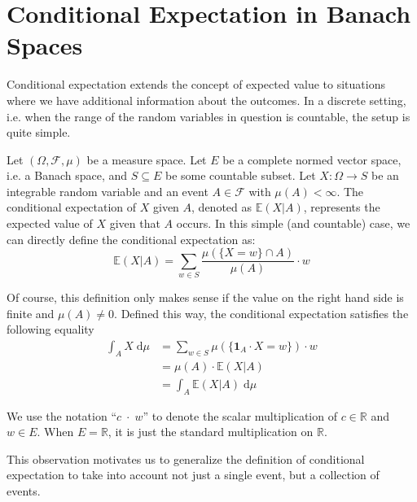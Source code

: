 ﻿%

\chapter{Conditional Expectation in Banach Spaces}\label{chapter:conditional_expectation}

Conditional expectation extends the concept of expected value to situations where we have additional information about the outcomes. In a discrete setting, i.e. when the range of the random variables in question is countable, the setup is quite simple. 
\begin{example}
\par Let $(\Omega, \mathcal{F}, \mu)$ be a measure space. Let $E$ be a complete normed vector space, i.e. a Banach space, and $S \subseteq E$ be some countable subset. Let $X : \Omega \rightarrow S$ be an integrable random variable and an event $A \in \mathcal{F}$ with $\mu(A) < \infty$. The conditional expectation of $X$ given $A$, denoted as $\mathbb{E}(X \vert A)$, represents the expected value of $X$ given that $A$ occurs. In this simple (and countable) case, we can directly define the conditional expectation as:
\[
	\mathbb{E}(X \vert A) = \sum_{w \in S} \frac{\mu(\{X = w\} \cap A)}{\mu(A)} \cdot w
\]
\end{example}
Of course, this definition only makes sense if the value on the right hand side is finite and $\mu(A) \neq 0$. Defined this way, the conditional expectation satisfies the following equality
\begin{align*}
	\int_A X \; \textrm{d} \mu &= \sum_{w \in S} \mu(\{\mathbf{1}_A \cdot X = w\}) \cdot w\\
	&= \mu(A) \cdot \mathbb{E}(X \vert A) \\
	&= \int_A \mathbb{E}(X \vert A) \; \textrm{d} \mu
\end{align*}

\begin{remark}
	We use the notation ``$c \; \cdot \; w$'' to denote the scalar multiplication of $c \in \mathbb{R}$ and $w \in E$. When $E = \mathbb{R}$, it is just the standard multiplication on $\mathbb{R}$. 
\end{remark}

This observation motivates us to generalize the definition of conditional expectation to take into account not just a single event, but a collection of events. 

